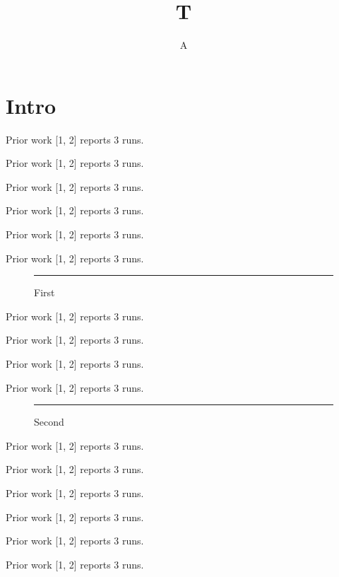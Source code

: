 \documentclass{article}
\title{T}\author{A}
\newcommand\para[1]{\lipsum[#1] Prior work [1, 2] reports 3 runs.\par}
\begin{document}
\maketitle
\section{Intro}
\para{1}\para{2}\para{3}\para{4}\para{5}\para{6}
\begin{figure}[t]\centering\rule{4cm}{3cm}\caption{First}\label{fig:a}\end{figure}
\para{7}\para{8}\para{9}\para{10}
\begin{figure}[t]\centering\rule{4cm}{3cm}\caption{Second}\label{fig:b}\end{figure}
\para{11}\para{12}\para{13}\para{14}\para{15}\para{16}
\end{document}
